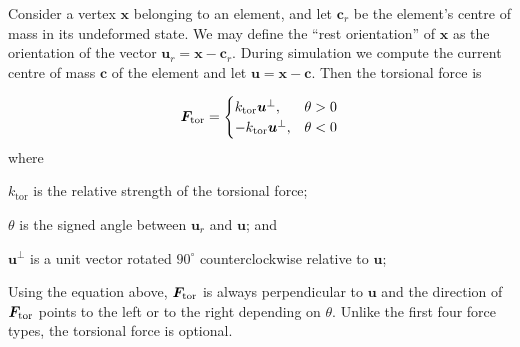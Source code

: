 Consider a vertex $\bm{x}$ belonging
to an element, and let $\bm{c}_r$ be the element's centre of mass in
its undeformed state.  We may define the ``rest orientation'' of
$\bm{x}$ as the orientation of the vector $\bm{u}_r = \bm{x}-\bm{c}_r$.
During simulation we compute the current centre of mass $\bm{c}$ of 
the element and let $\bm{u}=\bm{x}-\bm{c}$.  Then the torsional force
is

\begin{equation}
  \bm{F}_\mathrm{tor} =\begin{cases}
    k_\mathrm{tor}\bm{u}^\perp, & \theta > 0\\
    -k_\mathrm{tor}\bm{u}^\perp, & \theta < 0
  \end{cases}
\end{equation}
where
\begin{packeddescriptions}
	\item[$k_\mathrm{tor}$]  is the relative strength of the torsional force;
	\item[$\theta$] is the signed angle between $\bm{u}_r$ and $\bm{u}$; and
	\item[$\bm{u}^\perp$] is a unit vector rotated $90^\circ$
		counterclockwise relative to $\bm{u}$;
\end{packeddescriptions}

Using the equation above, $\bm{F}_\mathrm{tor}$ is always perpendicular to $\bm{u}$
and the direction of $\bm{F}_\mathrm{tor}$ points to the left or to the right depending on $\theta$.
Unlike the first four force types, the torsional force is optional.

